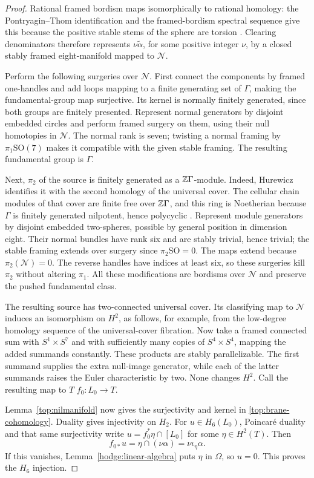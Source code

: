 \begin{proof}
Rational framed bordism maps isomorphically to rational homology: the
Pontryagin--Thom identification and the framed-bordism spectral sequence
give this because the positive stable stems of the sphere are torsion
\cite[proof of Proposition~3.1]{framed-rational}.  Clearing denominators
therefore represents $\nu\widetilde\alpha$, for some positive integer
$\nu$, by a closed stably framed eight-manifold mapped to $\mathcal N$.

Perform the following surgeries over $\mathcal N$.  First connect the
components by framed one-handles and add loops mapping to a finite
generating set of $\Gamma$, making the fundamental-group map
surjective.  Its kernel is normally finitely generated, since both
groups are finitely presented.  Represent normal generators by disjoint
embedded circles and perform framed surgery on them, using their null
homotopies in $\mathcal N$.  The normal rank is seven; twisting a
normal framing by $\pi_1\mathrm{SO}(7)$ makes it compatible with the
given stable framing.  The resulting fundamental group is $\Gamma$.

Next, $\pi_2$ of the source is finitely generated as a
$\mathbb Z\Gamma$-module.  Indeed, Hurewicz identifies it with the second
homology of the universal cover.  The cellular chain modules of that
cover are finite free over $\mathbb Z\Gamma$, and this ring is Noetherian
because $\Gamma$ is finitely generated nilpotent, hence polycyclic
\cite{hall}.  Represent module generators by disjoint embedded
two-spheres, possible by general position in dimension eight.  Their
normal bundles have rank six and are stably trivial, hence trivial;
the stable framing extends over surgery since $\pi_2\mathrm{SO}=0$.
The maps extend because $\pi_2(\mathcal N)=0$.  The reverse handles
have indices at least six, so these surgeries kill $\pi_2$ without
altering $\pi_1$.  All these modifications are bordisms over
$\mathcal N$ and preserve the pushed fundamental class.

The resulting source has two-connected universal cover.  Its
classifying map to $\mathcal N$ induces an isomorphism on $H^2$,
as follows, for example, from the low-degree homology sequence of the
universal-cover fibration.  Now take a framed connected sum with
$S^1\times S^7$ and with sufficiently many copies of
$S^4\times S^4$, mapping the added summands constantly.  These
products are stably parallelizable.  The first summand supplies the
extra null-image generator, while each of the latter summands raises
the Euler characteristic by two.  None changes $H^2$.  Call the
resulting map to $T$ $f_0:L_0\to T$.

Lemma~\ref{top:nilmanifold} now gives the surjectivity and kernel in
\eqref{top:brane-cohomology}.  Duality gives injectivity on $H_2$.
For $u\in H_6(L_0)$, Poincar\'e duality and that same surjectivity
write $u=f_0^*\eta\cap[L_0]$ for some $\eta\in H^2(T)$.  Then
\[
 f_{0*}u=\eta\cap(\nu\alpha)=\nu\iota_\eta\alpha.
\]
If this vanishes, Lemma~\ref{hodge:linear-algebra} puts $\eta$ in
$\Omega$, so $u=0$.  This proves the $H_6$ injection.
\end{proof}

